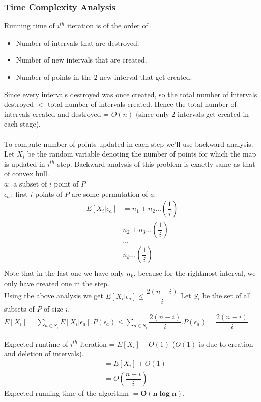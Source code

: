 \documentclass[a4paper]{article}
\begin{document}
\subsubsection*{Time Complexity Analysis}
Running time of $i^{th}$ iteration is of the order of
\begin{itemize}
    \item Number of intervals that are destroyed.
    \item Number of new intervals that are created.
    \item Number of points in the $2$ new interval that get created.
\end{itemize}
Since every intervals destroyed was once created, so the total number of intervals destroyed $<$ total number of intervals created. Hence the total number of intervals created and destroyed = $O(n)$ (since only $2$ intervals get created in each stage). \\ \\
To compute number of points updated in each step we'll use backward analysis. \\
Let $X_i$ be the random variable denoting the number of points for which the map is updated in $i^{th}$ step.
Backward analysis of this problem is exactly same as that of convex hull. \\
$a: $ a subset of $i$ point of $P$ \\
$\epsilon_a: $ first $i$ points of $P$ are some permutation of $a$. \\
\begin{align*}
E[X_i | \epsilon_a] &= n_1 + n_2 \ldots (\dfrac{1}{i}) \\
                    & n_2 + n_3 \ldots (\dfrac{1}{i}) \\
                    & \ldots \\
                    & n_k \ldots (\dfrac{1}{i})\\
\end{align*}
Note that in the last one we have only $n_k$, because for the rightmost interval, we only have created one in the step. \\
Using the above analysis we get $E[X_i | \epsilon_a] \leq \dfrac{2(n-i)}{i}$
Let $S_i$ be the set of all subsets of $P$ of size $i$. \\
$E[X_i] = \sum_{a\in S_i} E[X_i | \epsilon_a]. P(\epsilon_a) \leq \sum_{a\in S_i} \dfrac{2(n-i)}{i}. P(\epsilon_a) = \dfrac{2(n-i)}{i}$ \\ \\
Expected runtime of $i^{th}$ iteration = $E[X_i] + O(1)$ ($O(1)$ is due to creation and deletion of intervals).
\begin{align*}
  &= E[X_i] + O(1) \\
  &= O(\dfrac{n-i}{i})
\end{align*}
Expected running time of the algorithm $\mathbf{= O(n \log n)}$.
\end{document}
